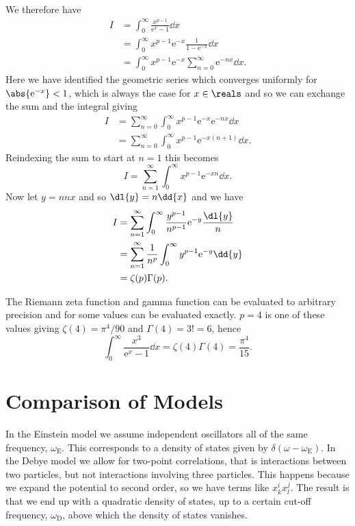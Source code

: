 \documentclass[fleqn]{NotesClass}
\newcommand*{\e}{\mathrm{e}}
\begin{document}
    We therefore have
    \begin{align}
        I &= \int_{0}^{\infty} \frac{x^{p - 1}}{\e^{x} - 1} \dd{x}\\
        &= \int_{0}^{\infty} x^{p - 1} \e^{-x} \frac{1}{1 - \e^{-x}} \dd{x}\\
        &= \int_{0}^{\infty} x^{p - 1} \e^{-x} \sum_{n = 0}^{\infty} \e^{-nx} \dd{x}.
    \end{align}
    Here we have identified the geometric series which converges uniformly for \(\abs{\e^{-x}} < 1\), which is always the case for \(x \in \reals\) and so we can exchange the sum and the integral giving
    \begin{align}
        I &= \sum_{n = 0}^{\infty} \int_{0}^{\infty} x^{p - 1} \e^{-x} \e^{-nx} \dd{x}\\
        &= \sum_{n = 0}^{\infty} \int_{0}^{\infty} x^{p - 1} \e^{-x(n + 1)} \dd{x}.
    \end{align}
    Reindexing the sum to start at \(n = 1\) this becomes
    \begin{equation}
        I = \sum_{n = 1}^{\infty} \int_{0}^{\infty} x^{p - 1} \e^{-xn} \dd{x}.
    \end{equation}
    Now let \(y = nnx\) and so \(\dl{y} = n\dd{x}\) and we have
    \begin{align}
        I &= \sum_{n = 1}^{\infty} \int_{0}^{\infty} \frac{y^{p - 1}}{n^{p - 1}} \e^{-y} \frac{\dl{y}}{n}\\
        &= \sum_{n = 1}^{\infty} \frac{1}{n^p} \int_{0}^{\infty} y^{p - 1} \e^{-y} \dd{y}\\
        &= \zeta(p)\Gamma(p).
    \end{align}
    
    The Riemann zeta function and gamma function can be evaluated to arbitrary precision and for some values can be evaluated exactly.
    \(p = 4\) is one of these values giving \(\zeta(4) = \pi^4/90\) and \(\Gamma(4) = 3! = 6\), hence
    \begin{equation}
        \int_{0}^{\infty} \frac{x^3}{\e^{x} - 1} \dd{x} = \zeta(4)\Gamma(4) = \frac{\pi^4}{15}.
    \end{equation}

    \section{Comparison of Models}
    In the Einstein model we assume independent oscillators all of the same frequency, \(\omega_{\mathrm{E}}\).
    This corresponds to a density of states given by \(\delta(\omega - \omega_{\mathrm{E}})\).
    In the Debye model we allow for two-point correlations, that is interactions between two particles, but not interactions involving three particles.
    This happens because we expand the potential to second order, so we have terms like \(x_k^i x_l^j\).
    The result is that we end up with a quadratic density of states, up to a certain cut-off frequency, \(\omega_{\mathrm{D}}\), above which the density of states vanishes.
    
\end{document}
